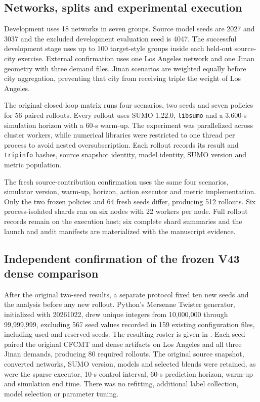 \subsection{Networks, splits and experimental execution}

Development uses 18 networks in seven groups.  Source model seeds are 2027 and
3037 and the excluded development evaluation seed is 4047.  The successful
development stage uses up to 100 target-style groups inside each held-out
source-city exercise.  External confirmation uses one Los Angeles network and
one Jinan geometry with three demand files.  Jinan scenarios are weighted
equally before city aggregation, preventing that city from receiving triple
the weight of Los Angeles.

The original closed-loop matrix runs four scenarios, two seeds and seven
policies for 56 paired rollouts.  Every rollout uses SUMO 1.22.0,
\texttt{libsumo} and a 3,600-s simulation horizon with a 60-s warm-up.
The experiment was parallelized
across cluster workers, while numerical libraries were restricted to one
thread per process to avoid nested oversubscription.  Each rollout records its
result and \texttt{tripinfo} hashes, source snapshot identity, model identity,
SUMO version and metric population.

The fresh source-contribution confirmation uses the same four scenarios,
simulator version, warm-up, horizon, action executor and metric implementation.
Only the two frozen policies and 64 fresh seeds differ, producing 512 rollouts.
Six process-isolated shards ran on six nodes with 22 workers per node.  Full
rollout records remain on the execution host; six complete shard summaries and
the launch and audit manifests are materialized with the manuscript evidence.

\subsection{Independent confirmation of the frozen V43 dense comparison}
\label{sec:methods-v43-dense-fresh10}

After the original two-seed results, a separate protocol fixed ten new seeds
and the analysis before any new rollout.  Python's Mersenne Twister generator,
initialized with 20261022, drew unique integers from 10,000,000 through
99,999,999, excluding 567 seed values recorded in 159 existing configuration
files, including used and reserved seeds.  The resulting roster is given in
.  Each seed paired the original CFCMT and dense
artifacts on Los Angeles and all three Jinan demands, producing 80 required
rollouts.  The original source snapshot, converted networks, SUMO version,
models and selected blends were retained, as were the sparse executor,
10-s control interval, 60-s prediction horizon, warm-up and simulation end
time.  There was no refitting, additional label collection, model selection or
parameter tuning.

